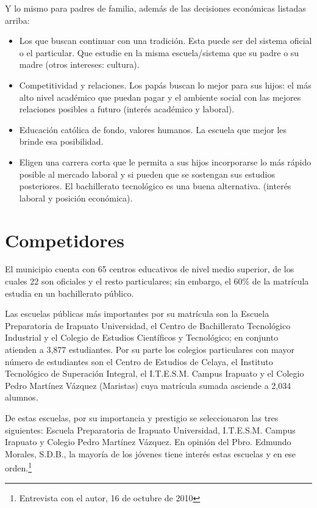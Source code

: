 Y lo mismo para padres de familia, además de las decisiones económicas listadas arriba:

\begin{itemize}
	\item Los que buscan continuar con una tradición. Esta puede ser del sistema oficial o el particular. Que estudie en la misma escuela/sistema que su padre o su madre (otros intereses: cultura).
	\item Competitividad y relaciones. Los papás buscan lo mejor para sus hijos: el más alto nivel académico que puedan pagar y el ambiente social con las mejores relaciones posibles a futuro (interés académico y laboral).
	\item Educación católica de fondo, valores humanos. La escuela que mejor les brinde esa posibilidad.
	\item Eligen una carrera corta que le permita a sus hijos incorporarse lo más rápido posible al mercado laboral y si pueden que se sostengan sus estudios posteriores. El bachillerato tecnológico es una buena alternativa. (interés laboral y posición económica).
\end{itemize}

\section{Competidores}
\label{sec:Neg:Competidores}

El municipio cuenta con 65 centros educativos de nivel medio superior, de los cuales 22 son oficiales y el resto particulares; sin embargo, el 60\% de la matrícula estudia en un bachillerato público.

Las escuelas públicas más importantes por su matrícula son la Escuela Preparatoria de Irapuato Universidad, el Centro de Bachillerato Tecnol\'ogico Industrial y el Colegio de Estudios Cient\'ificos y Tecnol\'ogico;
 en conjunto atienden a 3,877 estudiantes. Por su parte los colegios particulares con mayor número de estudiantes son el Centro de Estudios de Celaya, el Instituto Tecnol\'ogico de Superaci\'on Integral, el I.T.E.S.M. Campus Irapuato y el Colegio Pedro Mart\'inez V\'azquez (Maristas) cuya matrícula sumada asciende a 2,034 alumnos.

De estas escuelas, por su importancia y prestigio se seleccionaron las tres siguientes: Escuela Preparatoria de Irapuato Universidad, I.T.E.S.M. Campus Irapuato y Colegio Pedro Mart\'inez V\'azquez. En opini\'on del Pbro. Edmundo Morales, S.D.B., la mayoría de los jóvenes tiene interés estas escuelas y en ese orden.\footnote{Entrevista con el autor, 16 de octubre de 2010}


